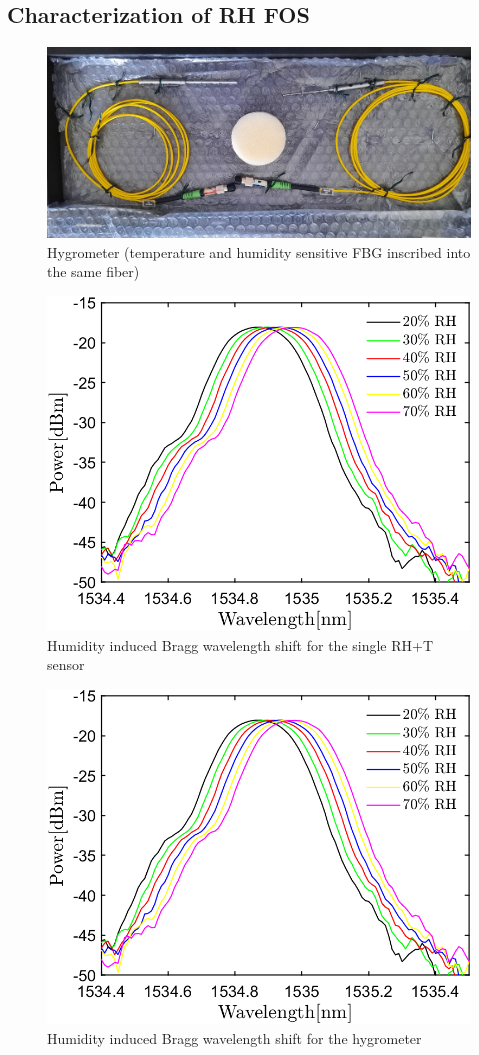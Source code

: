 \subsection{Characterization of RH FOS}

\begin{figure}[!h]
\centering
\includegraphics[width=0.65\columnwidth]{Chapter5/images/single1.jpeg}
\caption{Hygrometer (temperature and humidity sensitive FBG inscribed into the same fiber)}
\label{fig_single_photo}
\end{figure}

\begin{figure}[!h]
\centering
\includegraphics[width=0.6\columnwidth]{Chapter5/images/rh.png}
\caption{Humidity induced Bragg wavelength shift for the single RH+T sensor}
\label{fig_single_wavelength}
\end{figure}


\begin{figure}[!h]
\centering
\includegraphics[width=0.6\columnwidth]{Chapter5/images/rh.png}
\caption{Humidity induced Bragg wavelength shift for the hygrometer}
\label{fig_single_wavelength}
\end{figure}


